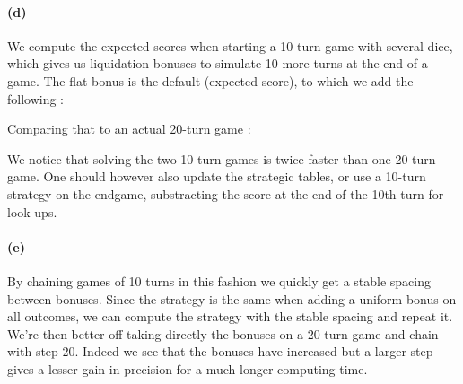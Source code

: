 \documentclass{article}
\newcommand{\getoutput}[1]{}
\begin{document}
    \paragraph{(d)}
    We compute the expected scores when starting a 10-turn game with several dice,
    which gives us liquidation bonuses to simulate 10 more turns at the end of a game.
    The flat bonus is the default (expected score), to which we add the following :
    \getoutput{2d1}
    Comparing that to an actual 20-turn game :
    \getoutput{2d2}
    We notice that solving the two 10-turn games is twice faster than one 20-turn game.
    One should however also update the strategic tables, or use a 10-turn strategy on the
    endgame, substracting the score at the end of the 10th turn for look-ups.

    \paragraph{(e)}
    By chaining games of 10 turns in this fashion we quickly get a stable spacing between
    bonuses.
    Since the strategy is the same when adding a uniform bonus on all outcomes,
    we can compute the strategy with the stable spacing and repeat it.
    We're then better off taking directly the bonuses on a 20-turn game and chain with step
    20. Indeed we see that the bonuses have increased but a larger step gives a lesser gain
    in precision for a much longer computing time.
    \getoutput{2e}
\end{document}
